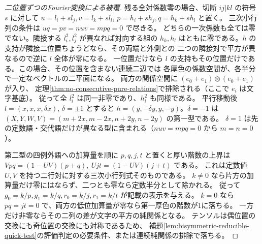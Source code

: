 \begin{proof}[二位置ずつのFourier変換による被覆]
残る全対係数零の場合、切断 $ij|kl$ の符号 $s$ に対して
$u=l_i+s l_j,v=l_k+s l_l$, $p=h_i+s h_j,q=h_k+s h_l$ と置く。
三次小行列の条件は $uq=pv=nuv=mpq=0$ で尽きる。
どちらの一次係数も全ては零でない。隣接する $l_i^2,l_j^2$ が異なれば対向する組の
$h_k,h_l$ はともに零である。$h$ の支持が隣接二位置ちょうどなら、その両端と外側との
二つの隣接対で平方が異なるので逆に $l$ 全体が零になる。
一位置だけなら $l$ の支持もその位置だけである。この場合、その位置を含まない連続二辺では
各厚色の係数空間が、各半分で一定なベクトルの二平面になる。
両方の関係空間に $(e_0+e_1)\otimes(e_0+e_1)$ が入り、
定理\ref{thm:no-consecutive-pure-relations}で排除される（ここで $e_i$ は文字基底）。
従って全 $l_i^2$ は同一非零であり、$h_i^2$ も同様である。
平行移動後 $l=(x,x,x,\delta x)$, $\delta=\pm1$ とすると
$h=(y,-\delta y,y,-y)$。$\delta=-1$ は
$(X,Y,W,V)=(m+2x,m-2x,n+2y,n-2y)$ の第一型である。
$\delta=1$ は先の定数語・交代語だけが異なる型に含まれる（$nuv=mpq=0$ から $m=n=0$）。

第二型の四例外語への加算量を順に $p,q,j,t$ と置くと厚い階数の上界は
$Vpq=(1-UV)(p+q),\ Ujt=(1-UV)(j+t)$ である。
これは定数値 $U,V$ を持つ二行対に対する三次小行列式そのものである。
$k\ne0$ なら片方の加算量だけ零にはならず、二つとも零なら定数半分として除かれる。
従って $g_0=k/p,g_1=k/q,r_0=k/j,r_1=k/t$ が記載の表示を与える。
$k=0$ なら $pq=jt=0$ で、両方の低位加算量が零なら第一厚色の階数が1に落ちる。
一方だけ非零ならその二列の差が文字の平方の純関係となる。
テンソルは偶位置の交換にも奇位置の交換にも対称であるため、
補題\ref{lem:bisymmetric-reducible-quick-test}の評価判定の必要条件、または連続純関係の排除で落ちる。
\end{proof}

